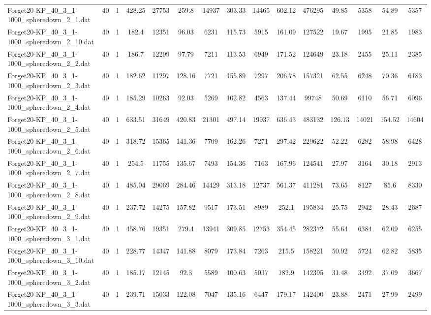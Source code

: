 \begin{table}[!ht]
{\begin{tabular}{lcccccccccccccc}
Forget20-KP\_40\_3\_1-1000\_spheredown\_2\_1.dat & 40 & 1 & 428.25 & 27753 & 259.8 & 14937 & 303.33 & 14465 & 602.12 & 476295 & 49.85 & 5358 & 54.89 & 5357 \\
Forget20-KP\_40\_3\_1-1000\_spheredown\_2\_10.dat & 40 & 1 & 182.4 & 12351 & 96.03 & 6231 & 115.73 & 5915 & 161.09 & 127522 & 19.67 & 1995 & 21.85 & 1983 \\
Forget20-KP\_40\_3\_1-1000\_spheredown\_2\_2.dat & 40 & 1 & 186.7 & 12299 & 97.79 & 7211 & 113.53 & 6949 & 171.52 & 124649 & 23.18 & 2455 & 25.11 & 2385 \\
Forget20-KP\_40\_3\_1-1000\_spheredown\_2\_3.dat & 40 & 1 & 182.62 & 11297 & 128.16 & 7721 & 155.89 & 7297 & 206.78 & 157321 & 62.55 & 6248 & 70.36 & 6183 \\
Forget20-KP\_40\_3\_1-1000\_spheredown\_2\_4.dat & 40 & 1 & 185.29 & 10263 & 92.03 & 5269 & 102.82 & 4563 & 137.44 & 99748 & 50.69 & 6110 & 56.71 & 6096 \\
Forget20-KP\_40\_3\_1-1000\_spheredown\_2\_5.dat & 40 & 1 & 633.51 & 31649 & 420.83 & 21301 & 497.14 & 19937 & 636.43 & 483132 & 126.13 & 14021 & 154.52 & 14604 \\
Forget20-KP\_40\_3\_1-1000\_spheredown\_2\_6.dat & 40 & 1 & 318.72 & 15365 & 141.36 & 7709 & 162.26 & 7271 & 297.42 & 229622 & 52.22 & 6282 & 58.98 & 6428 \\
Forget20-KP\_40\_3\_1-1000\_spheredown\_2\_7.dat & 40 & 1 & 254.5 & 11755 & 135.67 & 7493 & 154.36 & 7163 & 167.96 & 124541 & 27.97 & 3164 & 30.18 & 2913 \\
Forget20-KP\_40\_3\_1-1000\_spheredown\_2\_8.dat & 40 & 1 & 485.04 & 29069 & 284.46 & 14429 & 313.18 & 12737 & 561.37 & 411281 & 73.65 & 8127 & 85.6 & 8330 \\
Forget20-KP\_40\_3\_1-1000\_spheredown\_2\_9.dat & 40 & 1 & 237.72 & 14275 & 157.82 & 9517 & 173.51 & 8989 & 252.1 & 195834 & 25.75 & 2942 & 28.43 & 2687 \\
Forget20-KP\_40\_3\_1-1000\_spheredown\_3\_1.dat & 40 & 1 & 458.76 & 19351 & 279.4 & 13941 & 309.85 & 12753 & 354.45 & 282372 & 55.64 & 6384 & 62.09 & 6255 \\
Forget20-KP\_40\_3\_1-1000\_spheredown\_3\_10.dat & 40 & 1 & 228.77 & 14347 & 141.88 & 8079 & 173.84 & 7263 & 215.5 & 158221 & 50.92 & 5724 & 62.82 & 5835 \\
Forget20-KP\_40\_3\_1-1000\_spheredown\_3\_2.dat & 40 & 1 & 185.17 & 12145 & 92.3 & 5589 & 100.63 & 5037 & 182.9 & 142395 & 31.48 & 3492 & 37.09 & 3667 \\
Forget20-KP\_40\_3\_1-1000\_spheredown\_3\_3.dat & 40 & 1 & 239.71 & 15033 & 122.08 & 7047 & 135.16 & 6447 & 179.17 & 142400 & 23.88 & 2471 & 27.99 & 2499 \\

\end{tabular}}
\end{table}
